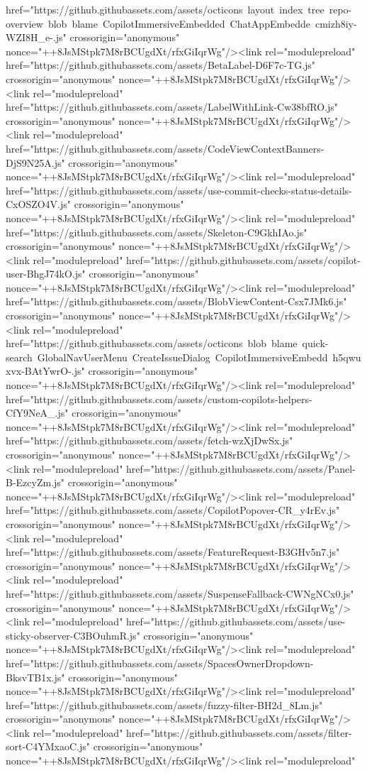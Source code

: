 href="https://github.githubassets.com/assets/octicons~layout~index~tree~repo-overview~blob~blame~CopilotImmersiveEmbedded~ChatAppEmbedde~cmizh8iy-WZI8H_e-.js" crossorigin="anonymous" nonce="++8JsMStpk7M8rBCUgdXt/rfxGiIqrWg"/><link rel="modulepreload" href="https://github.githubassets.com/assets/BetaLabel-D6F7c-TG.js" crossorigin="anonymous" nonce="++8JsMStpk7M8rBCUgdXt/rfxGiIqrWg"/><link rel="modulepreload" href="https://github.githubassets.com/assets/LabelWithLink-Cw38bfRO.js" crossorigin="anonymous" nonce="++8JsMStpk7M8rBCUgdXt/rfxGiIqrWg"/><link rel="modulepreload" href="https://github.githubassets.com/assets/CodeViewContextBanners-DjS9N25A.js" crossorigin="anonymous" nonce="++8JsMStpk7M8rBCUgdXt/rfxGiIqrWg"/><link rel="modulepreload" href="https://github.githubassets.com/assets/use-commit-checks-status-details-CxOSZO4V.js" crossorigin="anonymous" nonce="++8JsMStpk7M8rBCUgdXt/rfxGiIqrWg"/><link rel="modulepreload" href="https://github.githubassets.com/assets/Skeleton-C9GkhIAo.js" crossorigin="anonymous" nonce="++8JsMStpk7M8rBCUgdXt/rfxGiIqrWg"/><link rel="modulepreload" href="https://github.githubassets.com/assets/copilot-user-BhgJ74kO.js" crossorigin="anonymous" nonce="++8JsMStpk7M8rBCUgdXt/rfxGiIqrWg"/><link rel="modulepreload" href="https://github.githubassets.com/assets/BlobViewContent-Csx7JMk6.js" crossorigin="anonymous" nonce="++8JsMStpk7M8rBCUgdXt/rfxGiIqrWg"/><link rel="modulepreload" href="https://github.githubassets.com/assets/octicons~blob~blame~quick-search~GlobalNavUserMenu~CreateIssueDialog~CopilotImmersiveEmbedd~h5qwuxvx-BAtYwrO-.js" crossorigin="anonymous" nonce="++8JsMStpk7M8rBCUgdXt/rfxGiIqrWg"/><link rel="modulepreload" href="https://github.githubassets.com/assets/custom-copilots-helpers-CfY9NeA_.js" crossorigin="anonymous" nonce="++8JsMStpk7M8rBCUgdXt/rfxGiIqrWg"/><link rel="modulepreload" href="https://github.githubassets.com/assets/fetch-wzXjDwSx.js" crossorigin="anonymous" nonce="++8JsMStpk7M8rBCUgdXt/rfxGiIqrWg"/><link rel="modulepreload" href="https://github.githubassets.com/assets/Panel-B-EzcyZm.js" crossorigin="anonymous" nonce="++8JsMStpk7M8rBCUgdXt/rfxGiIqrWg"/><link rel="modulepreload" href="https://github.githubassets.com/assets/CopilotPopover-CR_y4rEv.js" crossorigin="anonymous" nonce="++8JsMStpk7M8rBCUgdXt/rfxGiIqrWg"/><link rel="modulepreload" href="https://github.githubassets.com/assets/FeatureRequest-B3GHv5n7.js" crossorigin="anonymous" nonce="++8JsMStpk7M8rBCUgdXt/rfxGiIqrWg"/><link rel="modulepreload" href="https://github.githubassets.com/assets/SuspenseFallback-CWNgNCx0.js" crossorigin="anonymous" nonce="++8JsMStpk7M8rBCUgdXt/rfxGiIqrWg"/><link rel="modulepreload" href="https://github.githubassets.com/assets/use-sticky-observer-C3BOuhmR.js" crossorigin="anonymous" nonce="++8JsMStpk7M8rBCUgdXt/rfxGiIqrWg"/><link rel="modulepreload" href="https://github.githubassets.com/assets/SpacesOwnerDropdown-BksvTB1x.js" crossorigin="anonymous" nonce="++8JsMStpk7M8rBCUgdXt/rfxGiIqrWg"/><link rel="modulepreload" href="https://github.githubassets.com/assets/fuzzy-filter-BH2d_8Lm.js" crossorigin="anonymous" nonce="++8JsMStpk7M8rBCUgdXt/rfxGiIqrWg"/><link rel="modulepreload" href="https://github.githubassets.com/assets/filter-sort-C4YMxaoC.js" crossorigin="anonymous" nonce="++8JsMStpk7M8rBCUgdXt/rfxGiIqrWg"/><link rel="modulepreload" 